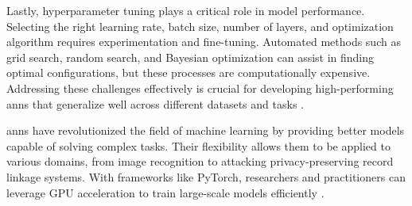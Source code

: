 Lastly, hyperparameter tuning plays a critical role in model performance.
Selecting the right learning rate, batch size, number of layers, and optimization algorithm requires experimentation and fine-tuning.
Automated methods such as grid search, random search, and Bayesian optimization can assist in finding optimal configurations, but these processes are computationally expensive.
Addressing these challenges effectively is crucial for developing high-performing \ac{ann}s that generalize well across different datasets and tasks \cite{pytorchPyTorch}.

\ac{ann}s have revolutionized the field of machine learning by providing better models capable of solving complex tasks.
Their flexibility allows them to be applied to various domains, from image recognition to attacking privacy-preserving record linkage systems.
With frameworks like PyTorch, researchers and practitioners can leverage GPU acceleration to train large-scale models efficiently \cite{pytorchPyTorch}.

